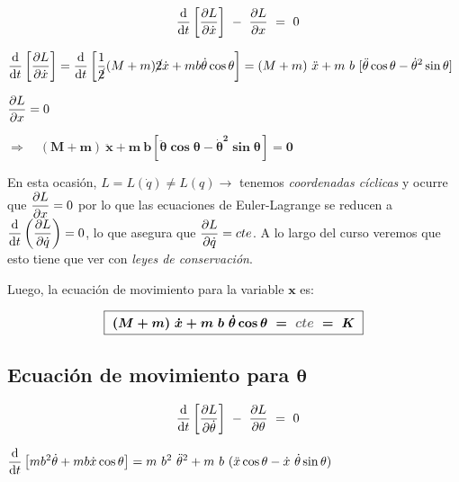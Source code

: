 $$\displaystyle \ \ \dv{t} \left[ \pdv{ L }{\dot x} \right] \ - \ \pdv{L}{x} \ = \ 0	$$

$\displaystyle \dv{t} \left[ \pdv {L} {\dot x} \right]=
\dv{t} \left[  \dfrac{1}{\cancel{2}} (M+m) \cancel{2} \dot x +   m b \dot \theta \cos \theta \right]=
(M+m)\ \ddot x +m\ b \ [\ddot \theta \cos \theta - \dot \theta^2 \sin \theta]$

$\displaystyle \pdv{L}{x}=0$

\begin{flushright}
	$\Rightarrow \quad \boldsymbol{(M+m)\ \ddot x + m\ b [\ddot \theta \cos \theta -\dot \theta^2 \sin \theta]=0}$
\end{flushright}

En esta ocasión,
$L=L(\dot q) \neq L(q) \to$ tenemos \emph{coordenadas cíclicas} y ocurre que $\displaystyle \pdv{L}{x}=0$ por lo que las ecuaciones de Euler-Lagrange se reducen a $\displaystyle \dv{t} \left( \pdv{L}{\dot q} \right) =0$, lo que asegura que $\displaystyle \pdv{L}{\dot q}=cte$.
\textcolor{gris}{A lo largo del curso veremos que esto tiene que ver con \emph{leyes de conservación}}.


Luego, la ecuación de movimiento para la variable $\boldsymbol x$ es:

\begin{equation}
\boxed{ \ 
\boldsymbol{
(M+m)\ \dot x + m\ b\ \dot \theta \cos \theta \ = \
\textcolor{gris}{cte}
\ = \ K 
} \ }
\end{equation}




\vspace{0.5cm}
\subsection{Ecuación de movimiento para $\boldsymbol \theta$}
\vspace{0.5cm}

$$\displaystyle \ \ \dv{t} \left[ \pdv{ L }{\dot \theta} \right] \ - \ \pdv{L}{\theta} \ = \ 0	$$


$\displaystyle \dv{t} \left[ mb^2 \dot \theta + m b \dot x \cos \theta \right]= m\ b^2 \ \ddot \theta^2 + m \ b \ ( \ddot x \cos \theta - \dot x \ \dot \theta \sin \theta )$

